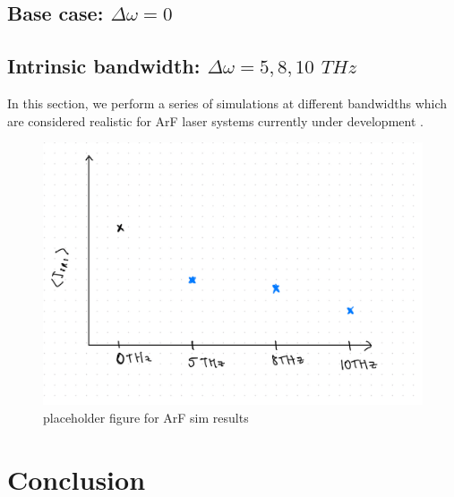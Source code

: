 \subsection{Base case: $\Delta\omega=0$}

\subsection{Intrinsic bandwidth: $\Delta\omega=5,8,10$ $\si{THz}$}
In this section, we perform a series of simulations at different bandwidths which are considered realistic for ArF laser systems currently under development \citep{Obenschain2020}.

\begin{figure}[ht]
   \centering
    \includegraphics[width=0.75\columnwidth]{Chapters/C5_broadband/arf_placeholder.jpeg}
    \caption{placeholder figure for ArF sim results}
    \label{fig:ArF}
\end{figure}{}


\section{Conclusion}


%
%
